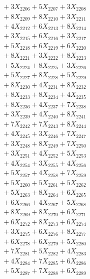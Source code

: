 \documentclass[a4paper,10pt]{article}
\begin{document}
{\begin{align}
&\;  + 3 X_{2206} + 5 X_{2207} + 3 X_{2208} \\[0.3ex]
&\;  + 8 X_{2209} + 8 X_{2210} + 3 X_{2211} \\[0.3ex]
&\;  + 4 X_{2212} + 6 X_{2213} + 8 X_{2214} \\[0.3ex]
&\;  + 3 X_{2215} + 6 X_{2216} + 3 X_{2217} \\[0.3ex]
&\;  + 5 X_{2218} + 6 X_{2219} + 6 X_{2220} \\[0.3ex]
&\;  + 8 X_{2221} + 3 X_{2222} + 8 X_{2223} \\[0.3ex]
&\;  + 5 X_{2224} + 8 X_{2225} + 3 X_{2226} \\[0.3ex]
&\;  + 5 X_{2227} + 8 X_{2228} + 5 X_{2229} \\[0.5ex]\allowbreak
&\;  + 8 X_{2230} + 4 X_{2231} + 8 X_{2232} \\[0.3ex]
&\;  + 8 X_{2233} + 8 X_{2234} + 4 X_{2235} \\[0.3ex]
&\;  + 8 X_{2236} + 4 X_{2237} + 7 X_{2238} \\[0.3ex]
&\;  + 3 X_{2239} + 4 X_{2240} + 8 X_{2241} \\[0.3ex]
&\;  + 7 X_{2242} + 7 X_{2243} + 8 X_{2244} \\[0.3ex]
&\;  + 4 X_{2245} + 3 X_{2246} + 7 X_{2247} \\[0.3ex]
&\;  + 3 X_{2248} + 8 X_{2249} + 7 X_{2250} \\[0.3ex]
&\;  + 3 X_{2251} + 4 X_{2252} + 5 X_{2253} \\[0.3ex]
&\;  + 4 X_{2254} + 3 X_{2255} + 4 X_{2256} \\[0.3ex]
&\;  + 5 X_{2257} + 4 X_{2258} + 7 X_{2259} \\[0.5ex]\allowbreak
&\;  + 5 X_{2260} + 5 X_{2261} + 5 X_{2262} \\[0.3ex]
&\;  + 5 X_{2263} + 8 X_{2264} + 6 X_{2265} \\[0.3ex]
&\;  + 6 X_{2266} + 4 X_{2267} + 5 X_{2268} \\[0.3ex]
&\;  + 8 X_{2269} + 8 X_{2270} + 6 X_{2271} \\[0.3ex]
&\;  + 6 X_{2272} + 8 X_{2273} + 6 X_{2274} \\[0.3ex]
&\;  + 3 X_{2275} + 6 X_{2276} + 8 X_{2277} \\[0.3ex]
&\;  + 6 X_{2278} + 6 X_{2279} + 5 X_{2280} \\[0.3ex]
&\;  + 7 X_{2281} + 5 X_{2282} + 4 X_{2283} \\[0.3ex]
&\;  + 4 X_{2284} + 7 X_{2285} + 6 X_{2286} \\[0.3ex]
&\;  + 5 X_{2287} + 7 X_{2288} + 6 X_{2289} \\[0.5ex]\allowbreak

\end{align}}
\end{document}
